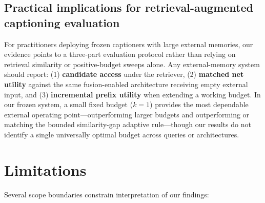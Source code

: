 \documentclass[11pt,a4paper]{article}
\begin{document}
\subsection{Practical implications for retrieval-augmented captioning evaluation}
For practitioners deploying frozen captioners with large external memories, our evidence points to a three-part evaluation protocol rather than relying on retrieval similarity or positive-budget sweeps alone. Any external-memory system should report: (1) \textbf{candidate access} under the retriever, (2) \textbf{matched net utility} against the same fusion-enabled architecture receiving empty external input, and (3) \textbf{incremental prefix utility} when extending a working budget. In our frozen system, a small fixed budget ($k=1$) provides the most dependable external operating point---outperforming larger budgets and outperforming or matching the bounded similarity-gap adaptive rule---though our results do not identify a single universally optimal budget across queries or architectures.

\section{Limitations}
Several scope boundaries constrain interpretation of our findings:
\end{document}
